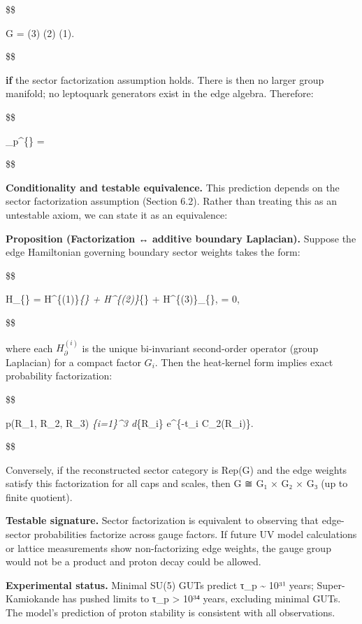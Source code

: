 \documentclass[11pt,a4paper]{article}
\theoremstyle{remark}
\begin{document}
\$\$

G = (3) \times {}(2) \times {}(1).

\$\$

\textbf{if} the sector factorization assumption holds. There is then no larger
group manifold; no leptoquark generators exist in the edge algebra.
Therefore:

\$\$

\tau\_p\^{}\{\} = \infty \quad {}

\$\$

\textbf{Conditionality and testable equivalence.} This prediction depends on the
sector factorization assumption (Section 6.2). Rather than treating this as
an untestable axiom, we can state it as an equivalence:

\textbf{Proposition (Factorization ↔ additive boundary Laplacian).} Suppose the
edge Hamiltonian governing boundary sector weights takes the form:

\$\$

H\_\{\partial\} = H\^{}\{(1)\}\emph{\{\partial\} + H\^{}\{(2)\}}\{\partial\} + H\^{}\{(3)\}\_\{\partial\},
 = 0,

\$\$

where each \(H^{(i)}_{\partial}\) is the unique bi-invariant second-order operator
(group Laplacian) for a compact factor \(G_i\). Then the heat-kernel form implies
exact probability factorization:

\$\$

p(R\_1, R\_2, R\_3) \propto \prod\emph{\{i=1\}\^{}3 d}\{R\_i\} e\^{}\{-t\_i C\_2(R\_i)\}.

\$\$

Conversely, if the reconstructed sector category is Rep(G) and the edge weights
satisfy this factorization for all caps and scales, then G ≅ G₁ × G₂ × G₃
(up to finite quotient).

\textbf{Testable signature.} Sector factorization is equivalent to observing that
edge-sector probabilities factorize across gauge factors. If future UV model
calculations or lattice measurements show non-factorizing edge weights, the
gauge group would not be a product and proton decay could be allowed.

\textbf{Experimental status.} Minimal SU(5) GUTs predict τ\_p \textasciitilde{} 10³¹
years; Super-Kamiokande has pushed limits to τ\_p \textgreater{} 10³⁴ years,
excluding minimal GUTs. The model's prediction of proton stability is
consistent with all observations.
\end{document}
